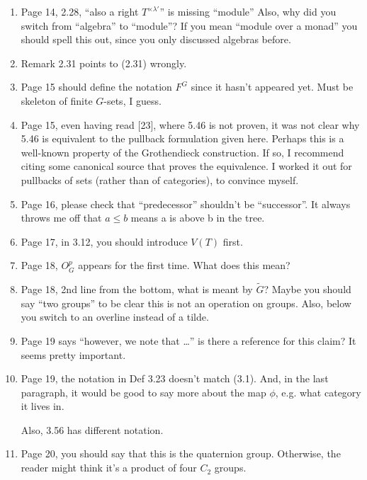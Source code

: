 \documentclass{article}
\begin{document}
\begin{enumerate}
	\item
	Page 14, 2.28, ``also a right $T^{\times \lambda'}$'' is missing ``module''
	Also, why did you switch from ``algebra'' to ``module''? If you mean ``module over a monad'' you should spell this out, since you only discussed algebras before.
	
	\item
	Remark 2.31 points to (2.31) wrongly.
	
	
	
	\item
	Page 15 should define the notation $F^G$ since it hasn't appeared yet. Must be skeleton of finite $G$-sets, I guess.
	
	
	\item
	Page 15, even having read [23], where 5.46 is not proven, it was not clear why 5.46 is equivalent to the pullback formulation given here. Perhaps this is a well-known property of the Grothendieck construction. If so, I recommend citing some canonical source that proves the equivalence. I worked it out for pullbacks of sets (rather than of categories), to convince myself.
	
	\item
	Page 16, please check that ``predecessor'' shouldn't be ``successor''. It always throws me off that $a \leq b$ means a is above b in the tree.
	
	\item
	Page 17, in 3.12, you should introduce $V(T)$ first. 
	
	
	\item
	Page 18, $O_G^p$ appears for the first time. What does this mean?
	
	\item
	Page 18, 2nd line from the bottom, what is meant by $\tilde{G}$? Maybe you should say ``two groups'' to be clear this is not an operation on groups. Also, below you switch to an overline instead of a tilde.
	
	\item
	Page 19 says ``however, we note that \dots'' is there a reference for this claim? It seems pretty important.
	
	\item
	Page 19, the notation in Def 3.23 doesn't match (3.1). And, in the last paragraph, it would be good to say more about the map $\phi$, e.g. what category it lives in.
	
	Also, 3.56 has different notation.
	
	\item
	Page 20, you should say that this is the quaternion group. Otherwise, the reader might think it's a product of four $C_2$ groups.
	

\end{enumerate}
\end{document}
